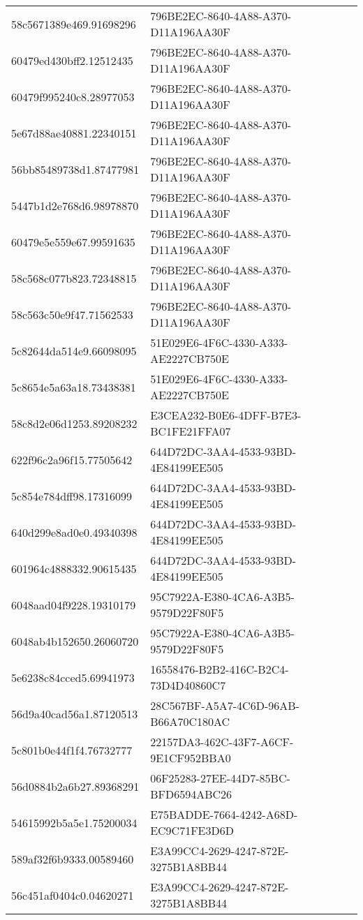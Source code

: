 \begin{tabular}{ll}
58c5671389e469.91698296 & 796BE2EC-8640-4A88-A370-D11A196AA30F \\
60479ed430bff2.12512435 & 796BE2EC-8640-4A88-A370-D11A196AA30F \\
60479f995240c8.28977053 & 796BE2EC-8640-4A88-A370-D11A196AA30F \\
5e67d88ae40881.22340151 & 796BE2EC-8640-4A88-A370-D11A196AA30F \\
56bb85489738d1.87477981 & 796BE2EC-8640-4A88-A370-D11A196AA30F \\
5447b1d2e768d6.98978870 & 796BE2EC-8640-4A88-A370-D11A196AA30F \\
60479e5e559e67.99591635 & 796BE2EC-8640-4A88-A370-D11A196AA30F \\
58c568c077b823.72348815 & 796BE2EC-8640-4A88-A370-D11A196AA30F \\
58c563c50e9f47.71562533 & 796BE2EC-8640-4A88-A370-D11A196AA30F \\
5c82644da514e9.66098095 & 51E029E6-4F6C-4330-A333-AE2227CB750E \\
5c8654e5a63a18.73438381 & 51E029E6-4F6C-4330-A333-AE2227CB750E \\
58c8d2e06d1253.89208232 & E3CEA232-B0E6-4DFF-B7E3-BC1FE21FFA07 \\
622f96c2a96f15.77505642 & 644D72DC-3AA4-4533-93BD-4E84199EE505 \\
5c854e784dff98.17316099 & 644D72DC-3AA4-4533-93BD-4E84199EE505 \\
640d299e8ad0e0.49340398 & 644D72DC-3AA4-4533-93BD-4E84199EE505 \\
601964c4888332.90615435 & 644D72DC-3AA4-4533-93BD-4E84199EE505 \\
6048aad04f9228.19310179 & 95C7922A-E380-4CA6-A3B5-9579D22F80F5 \\
6048ab4b152650.26060720 & 95C7922A-E380-4CA6-A3B5-9579D22F80F5 \\
5e6238c84cced5.69941973 & 16558476-B2B2-416C-B2C4-73D4D40860C7 \\
56d9a40cad56a1.87120513 & 28C567BF-A5A7-4C6D-96AB-B66A70C180AC \\
5c801b0e44f1f4.76732777 & 22157DA3-462C-43F7-A6CF-9E1CF952BBA0 \\
56d0884b2a6b27.89368291 & 06F25283-27EE-44D7-85BC-BFD6594ABC26 \\
54615992b5a5e1.75200034 & E75BADDE-7664-4242-A68D-EC9C71FE3D6D \\
589af32f6b9333.00589460 & E3A99CC4-2629-4247-872E-3275B1A8BB44 \\
56c451af0404c0.04620271 & E3A99CC4-2629-4247-872E-3275B1A8BB44 \\

\end{tabular}
